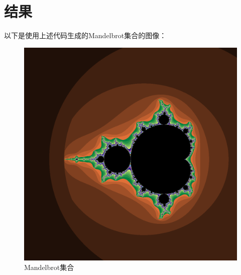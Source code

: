 \documentclass{ctexart}
\begin{document}
\section{结果}

以下是使用上述代码生成的Mandelbrot集合的图像：

\begin{figure}[h]
    \centering
    \includegraphics[width=1.0\textwidth]{mandelbrot.png}
    \caption{Mandelbrot集合}
\end{figure}
\end{document}
